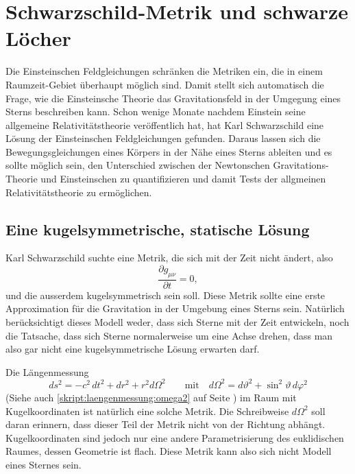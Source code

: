 %
%
%
\chapter{Schwarzschild-Metrik und schwarze Löcher%
\label{skript:chapter:schwarzschild}}
\rhead{}
Die Einsteinschen Feldgleichungen schränken die Metriken ein,
die in einem Raumzeit-Gebiet über\-haupt möglich sind.
Damit stellt sich automatisch die Frage, wie die Einsteinsche Theorie 
das Gravitationsfeld in der Umgegung eines Sterns beschreiben kann.
Schon wenige Monate nachdem Einstein seine allgemeine Relativitätstheorie
veröffentlich hat, hat Karl Schwarzschild eine Lösung der Einsteinschen
Feldgleichungen gefunden.
Daraus lassen sich die Bewegungsgleichungen eines Körpers in der Nähe
eines Sterns ableiten und es sollte möglich sein, den Unterschied zwischen
der Newtonschen Gravitations-Theorie und Einsteinschen  zu quantifizieren
und damit Tests der allgmeinen Relativitätstheorie zu ermöglichen.

\section{Eine kugelsymmetrische, statische Lösung}
\label{skript:schwarzschild:kugelsymmetrischeloesung}
Karl Schwarzschild suchte eine Metrik, die sich mit der Zeit nicht ändert,
also
\[
\frac{\partial g_{\mu\nu}}{\partial t}=0,
\]
und die ausserdem kugelsymmetrisch sein soll.
Diese Metrik sollte eine erste Approximation für die Gravitation in
der Umgebung eines Sterns sein.
Natürlich berücksichtigt dieses Modell weder, dass sich Sterne mit
der Zeit entwickeln, noch die Tatsache, dass sich Sterne normalerweise
um eine Achse drehen, dass man also gar nicht eine kugelsymmetrische
Lösung erwarten darf.

Die Längenmessung
\begin{equation}
ds^2
=
-c^2\,dt^2 + dr^2 + r^2 d\Omega^2
\qquad
\text{mit}
\quad
d\Omega^2 = d\vartheta^2 + \sin^2\vartheta\,d\varphi^2
\label{skript:kruemmung:euklid}
\end{equation}
(Siehe auch \eqref{skript:laengenmessung:omega2} auf Seite
\pageref{skript:laengenmessung:omega2})
im Raum mit Kugelkoordinaten ist natürlich eine solche Metrik.
Die Schreibweise $d\Omega^2$ soll daran erinnern, dass dieser Teil der
Metrik nicht von der Richtung abhängt.
Kugelkoordinaten sind jedoch nur eine andere Parametrisierung des euklidischen
Raumes, dessen Geometrie ist flach.
Diese Metrik kann also sich nicht Modell eines Sternes sein.

